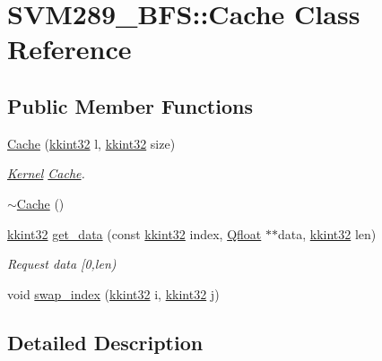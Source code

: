 \hypertarget{class_s_v_m289___b_f_s_1_1_cache}{}\section{S\+V\+M289\+\_\+\+B\+FS\+:\+:Cache Class Reference}
\label{class_s_v_m289___b_f_s_1_1_cache}
\subsection*{Public Member Functions}
\begin{DoxyCompactItemize}
\item 
\hyperlink{class_s_v_m289___b_f_s_1_1_cache_a46b5c8c4a6ab1dfcce296f088c301914}{Cache} (\hyperlink{namespace_k_k_b_a8fa4952cc84fda1de4bec1fbdd8d5b1b}{kkint32} l, \hyperlink{namespace_k_k_b_a8fa4952cc84fda1de4bec1fbdd8d5b1b}{kkint32} size)
\begin{DoxyCompactList}\small\item\em \hyperlink{class_s_v_m289___b_f_s_1_1_kernel}{Kernel} \hyperlink{class_s_v_m289___b_f_s_1_1_cache}{Cache}. \end{DoxyCompactList}\item 
\hyperlink{class_s_v_m289___b_f_s_1_1_cache_a90e41f69caf1ed0c91cfcb37250facf9}{$\sim$\+Cache} ()
\item 
\hyperlink{namespace_k_k_b_a8fa4952cc84fda1de4bec1fbdd8d5b1b}{kkint32} \hyperlink{class_s_v_m289___b_f_s_1_1_cache_a95c3d5d6c3dcbeccc839e075a18632c8}{get\+\_\+data} (const \hyperlink{namespace_k_k_b_a8fa4952cc84fda1de4bec1fbdd8d5b1b}{kkint32} index, \hyperlink{namespace_s_v_m289___b_f_s_a8b0a7657dcefcb6e9a857c9b5e2fd2ef}{Qfloat} $\ast$$\ast$data, \hyperlink{namespace_k_k_b_a8fa4952cc84fda1de4bec1fbdd8d5b1b}{kkint32} len)
\begin{DoxyCompactList}\small\item\em Request data \mbox{[}0,len) \end{DoxyCompactList}\item 
void \hyperlink{class_s_v_m289___b_f_s_1_1_cache_acd8f8f78ff0ca175f2fba2da2998b2ba}{swap\+\_\+index} (\hyperlink{namespace_k_k_b_a8fa4952cc84fda1de4bec1fbdd8d5b1b}{kkint32} i, \hyperlink{namespace_k_k_b_a8fa4952cc84fda1de4bec1fbdd8d5b1b}{kkint32} j)
\end{DoxyCompactItemize}


\subsection{Detailed Description}



